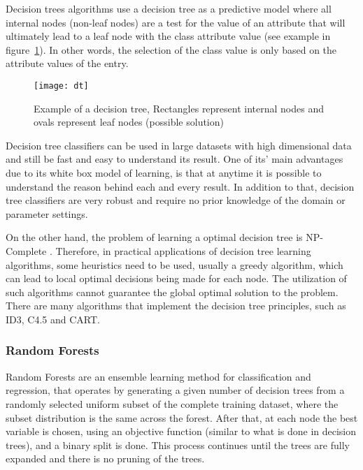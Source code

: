 Decision trees algorithms use a decision tree as a predictive model where all internal nodes (non-leaf nodes) are a test for the value of an attribute that will
ultimately lead to a leaf node with the class attribute value (see example in figure~\ref{fig:dtree}).
In other words, the selection of the class value is only based on the attribute values of the entry.\cite{HanKam06}

\begin{figure}[h]
  \begin{center}
    \leavevmode
    \texttt{[image: dt]}
    \caption{Example of a decision tree, Rectangles represent internal nodes and ovals represent leaf nodes (possible solution)\cite{KER:70953}}
    \label{fig:dtree}
  \end{center}
\end{figure}

Decision tree classifiers can be used in large datasets with high dimensional data and still be fast and easy to understand its result.
One of its' main advantages due to its white box model of learning, is that at anytime it is possible to understand the reason behind each and every result.
In addition to that, decision tree classifiers are very robust and require no prior knowledge of the domain or parameter settings.

On the other hand, the problem of learning a optimal decision tree is NP-Complete \cite{Hyafil197615}.
Therefore, in practical applications of decision tree learning algorithms, some heuristics need to be used,
usually a greedy algorithm, which can lead
to local optimal decisions being made for each node. The utilization of such algorithms cannot guarantee the global optimal solution to the problem.
There are many algorithms that implement the decision tree principles, such as ID3, C4.5 and CART.

\subsubsection{Random Forests}

Random Forests \cite{raey} are an ensemble learning method for classification and regression, that operates by generating a given number of 
decision trees from a randomly selected uniform subset of the complete training dataset, where the subset distribution is the same across the forest.
After that, at each node the best variable is chosen, using an objective function (similar to what is done in decision trees), and a binary split is done.
This process continues until the trees are fully expanded and there is no pruning of the trees.

